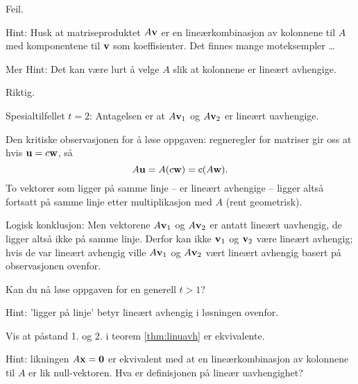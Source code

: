 \begin{losning}

\begin{punkt}
Feil.

\noindent
Hint: Husk at matriseproduktet $A\mathbf{v}$ er en lineærkombinasjon av kolonnene til $A$ med komponentene til $\mathbf{v}$ som koeffisienter. Det finnes mange moteksempler \ldots 

Mer Hint: Det kan være lurt å velge $A$ slik at kolonnene er lineært avhengige.
\end{punkt}


\begin{punkt}
Riktig.

\noindent
Spesialtilfellet $t=2$: Antagelsen er at $A\mathbf{v}_1$ og $A\mathbf{v}_2$ er lineært uavhengige. 

Den kritiske observasjonen for å løse oppgaven: regneregler for matriser gir oss at hvis $\mathbf{u}=c\mathbf{w}$, så $$A\mathbf{u}=A(c\mathbf{w})=c(A\mathbf{w}).$$ To vektorer som ligger på samme linje -- er lineært avhengige -- ligger altså fortsatt på samme linje etter multiplikasjon med $A$ (rent geometrisk).

Logisk konklusjon: Men vektorene $A\mathbf{v}_1$ og $A\mathbf{v}_2$ er antatt lineært uavhengig, de ligger altså ikke på samme linje. Derfor kan ikke $\mathbf{v}_1$ og $\mathbf{v}_2$ være lineært avhengig; hvis de var lineært avhengig ville $A\mathbf{v}_1$ og $A\mathbf{v}_2$ vært lineært avhengig basert på observasjonen ovenfor.

Kan du nå løse oppgaven for en generell $t>1$? 

\noindent
Hint: 'ligger på linje' betyr lineært avhengig i løsningen ovenfor.

\end{punkt}



\end{losning}



\begin{oppgave}
Vis at påstand 1. og 2. i teorem \ref{thm:linuavh} er ekvivalente.
\end{oppgave}

\begin{losning}
Hint: likningen $A\mathbf{x}=\mathbf{0}$ er ekvivalent med at en lineærkombinasjon av kolonnene til $A$ er lik null-vektoren. Hva er definisjonen på lineær uavhengighet?
\end{losning}

